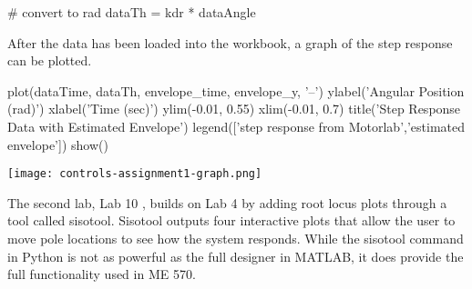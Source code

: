 \begin{tcolorbox}[breakable, enhanced jigsaw, title=ME 570: Assignment \ref{control_assignment_1}, 
    colframe=ksu-purple, colback=ksu-gray]
\begin{python}
# convert to rad
dataTh = kdr * dataAngle
\end{python}

After the data has been loaded into the workbook, a graph of the step
response can be plotted.

\begin{python}
plot(dataTime, dataTh, envelope_time, envelope_y, '--')
ylabel('Angular Position (rad)')
xlabel('Time (sec)')
ylim(-0.01, 0.55)
xlim(-0.01, 0.7)
title('Step Response Data with Estimated Envelope')
legend(['step response from Motorlab','estimated envelope'])
show()
\end{python}

\begin{center}
    \texttt{[image: controls-assignment1-graph.png]}
\end{center}

\end{tcolorbox}

The second lab, Lab 10 \cite{controls-10}, builds on Lab 4 by adding root locus plots through 
a tool called sisotool. Sisotool outputs four interactive plots that allow the user to move pole 
locations to see how the system responds. While the sisotool command in Python is not as powerful 
as the full designer in MATLAB, it does provide the full functionality used in ME 570.

\label{control_assignment_2}

